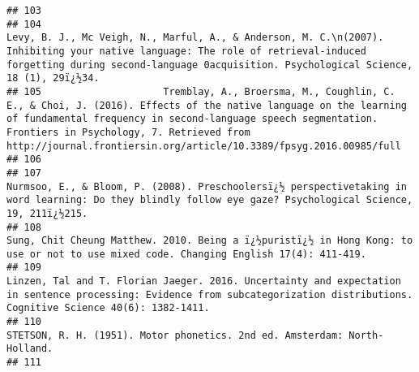 \documentclass[
  english,
  man]{apa6}
\begin{document}
\begin{verbatim}
## 103                                                                                                                                                                                                                                                                                                                    
## 104                                                                                            Levy, B. J., Mc Veigh, N., Marful, A., & Anderson, M. C.\n(2007). Inhibiting your native language: The role of retrieval-induced forgetting during second-language 0acquisition. Psychological Science, 18 (1), 29ï¿½34.
## 105                     Tremblay, A., Broersma, M., Coughlin, C. E., & Choi, J. (2016). Effects of the native language on the learning of fundamental frequency in second-language speech segmentation. Frontiers in Psychology, 7. Retrieved from http://journal.frontiersin.org/article/10.3389/fpsyg.2016.00985/full
## 106                                                                                                                                                                                                                                                                                                                    
## 107                                                                                                                                                         Nurmsoo, E., & Bloom, P. (2008). Preschoolersï¿½ perspectivetaking in word learning: Do they blindly follow eye gaze? Psychological Science, 19, 211ï¿½215.
## 108                                                                                                                                                                               Sung, Chit Cheung Matthew. 2010. Being a ï¿½puristï¿½ in Hong Kong: to use or not to use mixed code. Changing English 17(4): 411-419.
## 109                                                                                                                                     Linzen, Tal and T. Florian Jaeger. 2016. Uncertainty and expectation in sentence processing: Evidence from subcategorization distributions. Cognitive Science 40(6): 1382-1411.
## 110                                                                                                                                                                                                                                           STETSON, R. H. (1951). Motor phonetics. 2nd ed. Amsterdam: North-Holland.
## 111                                                                                                                                                                                                                                                                                                                    

\end{verbatim}
\end{document}
